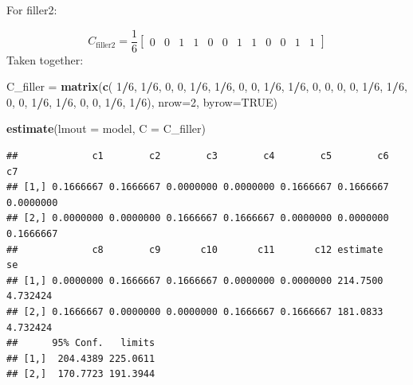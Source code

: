 \documentclass[
]{article}
\newenvironment{Shaded}{\begin{snugshade}}{\end{snugshade}}
\newcommand{\AttributeTok}[1]{\textcolor[rgb]{0.13,0.29,0.53}{#1}}
\newcommand{\ConstantTok}[1]{\textcolor[rgb]{0.56,0.35,0.01}{#1}}
\newcommand{\DecValTok}[1]{\textcolor[rgb]{0.00,0.00,0.81}{#1}}
\newcommand{\FunctionTok}[1]{\textcolor[rgb]{0.13,0.29,0.53}{\textbf{#1}}}
\newcommand{\NormalTok}[1]{#1}
\newcommand{\OtherTok}[1]{\textcolor[rgb]{0.56,0.35,0.01}{#1}}
\newcommand{\SpecialCharTok}[1]{\textcolor[rgb]{0.81,0.36,0.00}{\textbf{#1}}}
\begin{document}
For filler2:

\[
C_{\text{filler2}} = \frac{1}{6}
\begin{bmatrix}
0 & 0 & 1 & 1 & 0 & 0 & 1 & 1 & 0 & 0 & 1 & 1
\end{bmatrix}
\] Taken together:

\begin{Shaded}
\begin{Highlighting}[]
\NormalTok{C\_filler }\OtherTok{=} \FunctionTok{matrix}\NormalTok{(}\FunctionTok{c}\NormalTok{(}
  \DecValTok{1}\SpecialCharTok{/}\DecValTok{6}\NormalTok{, }\DecValTok{1}\SpecialCharTok{/}\DecValTok{6}\NormalTok{, }\DecValTok{0}\NormalTok{, }\DecValTok{0}\NormalTok{, }\DecValTok{1}\SpecialCharTok{/}\DecValTok{6}\NormalTok{, }\DecValTok{1}\SpecialCharTok{/}\DecValTok{6}\NormalTok{, }\DecValTok{0}\NormalTok{, }\DecValTok{0}\NormalTok{, }\DecValTok{1}\SpecialCharTok{/}\DecValTok{6}\NormalTok{, }\DecValTok{1}\SpecialCharTok{/}\DecValTok{6}\NormalTok{, }\DecValTok{0}\NormalTok{, }\DecValTok{0}\NormalTok{,  }
  \DecValTok{0}\NormalTok{, }\DecValTok{0}\NormalTok{, }\DecValTok{1}\SpecialCharTok{/}\DecValTok{6}\NormalTok{, }\DecValTok{1}\SpecialCharTok{/}\DecValTok{6}\NormalTok{, }\DecValTok{0}\NormalTok{, }\DecValTok{0}\NormalTok{, }\DecValTok{1}\SpecialCharTok{/}\DecValTok{6}\NormalTok{, }\DecValTok{1}\SpecialCharTok{/}\DecValTok{6}\NormalTok{, }\DecValTok{0}\NormalTok{, }\DecValTok{0}\NormalTok{, }\DecValTok{1}\SpecialCharTok{/}\DecValTok{6}\NormalTok{, }\DecValTok{1}\SpecialCharTok{/}\DecValTok{6}\NormalTok{), }\AttributeTok{nrow=}\DecValTok{2}\NormalTok{, }\AttributeTok{byrow=}\ConstantTok{TRUE}\NormalTok{)}

\FunctionTok{estimate}\NormalTok{(}\AttributeTok{lmout =}\NormalTok{ model, }\AttributeTok{C =}\NormalTok{ C\_filler)}
\end{Highlighting}
\end{Shaded}

\begin{verbatim}
##             c1        c2        c3        c4        c5        c6        c7
## [1,] 0.1666667 0.1666667 0.0000000 0.0000000 0.1666667 0.1666667 0.0000000
## [2,] 0.0000000 0.0000000 0.1666667 0.1666667 0.0000000 0.0000000 0.1666667
##             c8        c9       c10       c11       c12 estimate       se
## [1,] 0.0000000 0.1666667 0.1666667 0.0000000 0.0000000 214.7500 4.732424
## [2,] 0.1666667 0.0000000 0.0000000 0.1666667 0.1666667 181.0833 4.732424
##      95% Conf.   limits
## [1,]  204.4389 225.0611
## [2,]  170.7723 191.3944
\end{verbatim}
\end{document}
